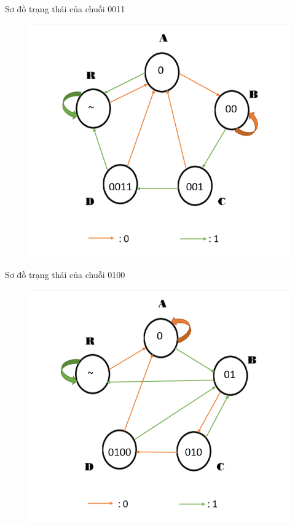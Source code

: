 \documentclass[a4paper]{article}
\begin{document}
		Sơ đồ trạng thái của chuỗi 0011
	\begin{center}
	\begin{figure}[h]
		\begin{center}
			\includegraphics[scale=0.53]{0011.png}
		\end{center}
	\end{figure}
	\end{center}
	\newpage
	Sơ đồ trạng thái của chuỗi 0100
	\begin{center}
	\begin{figure}[h]
		\begin{center}
			\includegraphics[scale=0.53]{0100.png}
		\end{center}
	\end{figure}
	\end{center}
	
\end{document}
